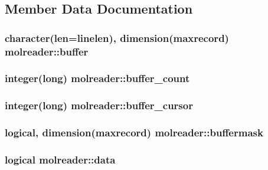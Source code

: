 \subsection{Member Data Documentation}
\hypertarget{classmolreader_a06d78b69405420664607fb01b4d8e97a}{
\subsubsection[{buffer}]{\setlength{\rightskip}{0pt plus 5cm}character(len={\bf linelen}), dimension({\bf maxrecord}) molreader\+::buffer\hspace{0.3cm}{\ttfamily [private]}}}\label{classmolreader_a06d78b69405420664607fb01b4d8e97a}
\hypertarget{classmolreader_ac7969154d301aab4a51cde89ec2f08ee}{
\subsubsection[{buffer\+\_\+count}]{\setlength{\rightskip}{0pt plus 5cm}integer(long) molreader\+::buffer\+\_\+count\hspace{0.3cm}{\ttfamily [private]}}}\label{classmolreader_ac7969154d301aab4a51cde89ec2f08ee}
\hypertarget{classmolreader_a7b2e4f11efe55d80469efa3f7aeacbab}{
\subsubsection[{buffer\+\_\+cursor}]{\setlength{\rightskip}{0pt plus 5cm}integer(long) molreader\+::buffer\+\_\+cursor\hspace{0.3cm}{\ttfamily [private]}}}\label{classmolreader_a7b2e4f11efe55d80469efa3f7aeacbab}
\hypertarget{classmolreader_a3368bfc7f2d07a7f472a8118220516a9}{
\subsubsection[{buffermask}]{\setlength{\rightskip}{0pt plus 5cm}logical, dimension({\bf maxrecord}) molreader\+::buffermask\hspace{0.3cm}{\ttfamily [private]}}}\label{classmolreader_a3368bfc7f2d07a7f472a8118220516a9}
\hypertarget{classmolreader_ad29941441961d6bb225120cc88f93db7}{
\subsubsection[{data}]{\setlength{\rightskip}{0pt plus 5cm}logical molreader\+::data\hspace{0.3cm}{\ttfamily [private]}}}\label{classmolreader_ad29941441961d6bb225120cc88f93db7}
